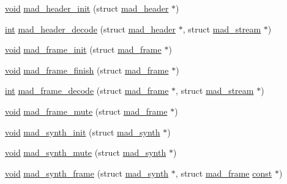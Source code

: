 \begin{DoxyCompactItemize}
\item 
\hyperlink{sound_8c_ae35f5844602719cf66324f4de2a658b3}{void} \hyperlink{lib-src_2libmad_2msvc_09_09_2mad_8h_a5e6a310d0e929761f5498bf7a7f23566}{mad\+\_\+header\+\_\+init} (struct \hyperlink{structmad__header}{mad\+\_\+header} $\ast$)
\item 
\hyperlink{xmltok_8h_a5a0d4a5641ce434f1d23533f2b2e6653}{int} \hyperlink{lib-src_2libmad_2msvc_09_09_2mad_8h_ac98c06c5e85cb8c0842b0383096f9ee9}{mad\+\_\+header\+\_\+decode} (struct \hyperlink{structmad__header}{mad\+\_\+header} $\ast$, struct \hyperlink{structmad__stream}{mad\+\_\+stream} $\ast$)
\item 
\hyperlink{sound_8c_ae35f5844602719cf66324f4de2a658b3}{void} \hyperlink{lib-src_2libmad_2msvc_09_09_2mad_8h_a3c78ba961e454462c18cfeba70d1137c}{mad\+\_\+frame\+\_\+init} (struct \hyperlink{structmad__frame}{mad\+\_\+frame} $\ast$)
\item 
\hyperlink{sound_8c_ae35f5844602719cf66324f4de2a658b3}{void} \hyperlink{lib-src_2libmad_2msvc_09_09_2mad_8h_a92fbcef46fd20f35426f5ad0853a8649}{mad\+\_\+frame\+\_\+finish} (struct \hyperlink{structmad__frame}{mad\+\_\+frame} $\ast$)
\item 
\hyperlink{xmltok_8h_a5a0d4a5641ce434f1d23533f2b2e6653}{int} \hyperlink{lib-src_2libmad_2msvc_09_09_2mad_8h_abcee46b2b808ebf6e0d1c3748b590a38}{mad\+\_\+frame\+\_\+decode} (struct \hyperlink{structmad__frame}{mad\+\_\+frame} $\ast$, struct \hyperlink{structmad__stream}{mad\+\_\+stream} $\ast$)
\item 
\hyperlink{sound_8c_ae35f5844602719cf66324f4de2a658b3}{void} \hyperlink{lib-src_2libmad_2msvc_09_09_2mad_8h_a1c0f45d2bbf2b433bc18159a01639b68}{mad\+\_\+frame\+\_\+mute} (struct \hyperlink{structmad__frame}{mad\+\_\+frame} $\ast$)
\item 
\hyperlink{sound_8c_ae35f5844602719cf66324f4de2a658b3}{void} \hyperlink{lib-src_2libmad_2msvc_09_09_2mad_8h_a17758012effd02195edac57db0480cec}{mad\+\_\+synth\+\_\+init} (struct \hyperlink{structmad__synth}{mad\+\_\+synth} $\ast$)
\item 
\hyperlink{sound_8c_ae35f5844602719cf66324f4de2a658b3}{void} \hyperlink{lib-src_2libmad_2msvc_09_09_2mad_8h_a2420929ab84b250fc2aaef25ccda6849}{mad\+\_\+synth\+\_\+mute} (struct \hyperlink{structmad__synth}{mad\+\_\+synth} $\ast$)
\item 
\hyperlink{sound_8c_ae35f5844602719cf66324f4de2a658b3}{void} \hyperlink{lib-src_2libmad_2msvc_09_09_2mad_8h_ae5ab86e983f98b726dca0552c65be28c}{mad\+\_\+synth\+\_\+frame} (struct \hyperlink{structmad__synth}{mad\+\_\+synth} $\ast$, struct \hyperlink{structmad__frame}{mad\+\_\+frame} \hyperlink{getopt1_8c_a2c212835823e3c54a8ab6d95c652660e}{const} $\ast$)

\end{DoxyCompactItemize}
